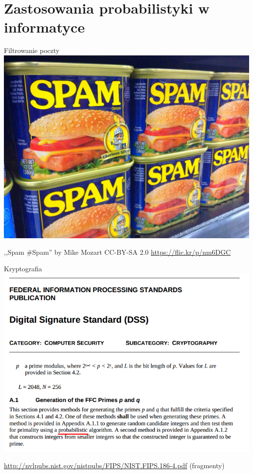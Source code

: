 \documentclass{beamer}
\begin{document}
\part{Zastosowania probabilistyki w informatyce}
\frame{\partpage}
\begin{frame}{Filtrowanie poczty}
\centering\includegraphics[width=.85\textwidth]{spam.jpg}

{\tiny ,,Spam \#Spam'' by Mike Mozart CC-BY-SA 2.0 \url{https://flic.kr/p/nm6DGC}}
\end{frame}
\begin{frame}{Kryptografia}
\centering\includegraphics[width=.85\textwidth]{dsa.png}

{\tiny \url{http://nvlpubs.nist.gov/nistpubs/FIPS/NIST.FIPS.186-4.pdf} (fragmenty)}
\end{frame}
\end{document}
